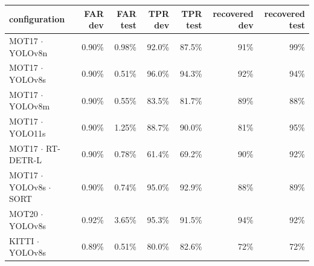 \begin{tabular}{lrrrrrr}
\toprule
configuration & FAR dev & FAR test & TPR dev & TPR test & recovered dev & recovered test \\
\midrule
MOT17 $\cdot$ YOLOv8n & 0.90\% & 0.98\% & 92.0\% & 87.5\% & 91\% & 99\% \\
MOT17 $\cdot$ YOLOv8s & 0.90\% & 0.51\% & 96.0\% & 94.3\% & 92\% & 94\% \\
MOT17 $\cdot$ YOLOv8m & 0.90\% & 0.55\% & 83.5\% & 81.7\% & 89\% & 88\% \\
MOT17 $\cdot$ YOLO11s & 0.90\% & 1.25\% & 88.7\% & 90.0\% & 81\% & 95\% \\
MOT17 $\cdot$ RT-DETR-L & 0.90\% & 0.78\% & 61.4\% & 69.2\% & 90\% & 92\% \\
MOT17 $\cdot$ YOLOv8s $\cdot$ SORT & 0.90\% & 0.74\% & 95.0\% & 92.9\% & 88\% & 89\% \\
MOT20 $\cdot$ YOLOv8s & 0.92\% & 3.65\% & 95.3\% & 91.5\% & 94\% & 92\% \\
KITTI $\cdot$ YOLOv8s & 0.89\% & 0.51\% & 80.0\% & 82.6\% & 72\% & 72\% \\
\bottomrule
\end{tabular}
